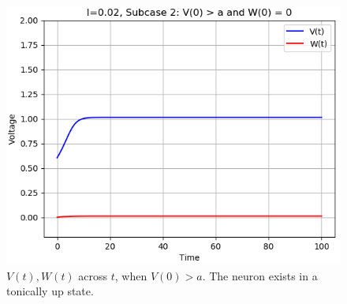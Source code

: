 \documentclass[12pt,a4paper]{article}
\begin{document}
	\begin{figure}[H]
	\centering
	\includegraphics[scale=0.6]{images/Figure_16.png}
	\caption{$V(t), W(t)$ across $t$, when $V(0)>a$. The neuron exists in a tonically up state.}
	\end{figure}



\break


\end{document}
